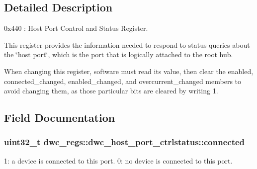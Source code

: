 \subsection{Detailed Description}
0x440 \-: Host Port Control and Status Register.

This register provides the information needed to respond to status queries about the \char`\"{}host port\char`\"{}, which is the port that is logically attached to the root hub.

When changing this register, software must read its value, then clear the enabled, connected\-\_\-changed, enabled\-\_\-changed, and overcurrent\-\_\-changed members to avoid changing them, as those particular bits are cleared by writing 1. 

\subsection{Field Documentation}
\hypertarget{uniondwc__regs_1_1dwc__host__port__ctrlstatus_aadfc4b8998833fb6deca97b2989dcd41}{
\subsubsection[{connected}]{\setlength{\rightskip}{0pt plus 5cm}uint32\-\_\-t dwc\-\_\-regs\-::dwc\-\_\-host\-\_\-port\-\_\-ctrlstatus\-::connected}}\label{uniondwc__regs_1_1dwc__host__port__ctrlstatus_aadfc4b8998833fb6deca97b2989dcd41}
1\-: a device is connected to this port. 0\-: no device is connected to this port.

